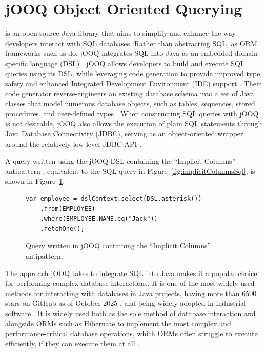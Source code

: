 \section{jOOQ Object Oriented Querying}\label{sec:jooq}

 is an open-source Java library that aims to simplify and enhance the way developers interact with SQL databases. Rather than abstracting SQL, as ORM frameworks such as  do, jOOQ integrates SQL into Java as an embedded domain-specific language (DSL) . jOOQ allows developers to build and execute SQL queries using its DSL, while leveraging code generation to provide improved type safety and enhanced Integrated Development Environment (IDE) support . Their code generator reverse-engineers an existing database schema into a set of Java classes that model numerous database objects, such as tables, sequences, stored procedures, and user-defined types . When constructing SQL queries with jOOQ is not desirable, jOOQ also allows the execution of plain SQL statements through Java Database Connectivity (JDBC), serving as an object-oriented wrapper around the relatively low-level JDBC API .

A query written using the jOOQ DSL containing the “Implicit Columns” antipattern , equivalent to the SQL query in Figure~\ref{fig:implicitColumnsSql}, is shown in Figure~\ref{fig:implicitColumnsJooq}.

\begin{figure}[h]
    \begin{lstlisting}[frame=none, basicstyle=\small]
var employee = dslContext.select(DSL.asterisk())
    .from(EMPLOYEE)
    .where(EMPLOYEE.NAME.eq("Jack"))
    .fetchOne();
    \end{lstlisting}
    \caption{Query written in jOOQ containing the “Implicit Columns” antipattern.}
    \label{fig:implicitColumnsJooq}
\end{figure}

The approach jOOQ takes to integrate SQL into Java makes it a popular choice for performing complex database interactions. It is one of the most widely used methods for interacting with databases in Java projects, having more than \num{6500} stars on GitHub as of October 2025 , and being widely adopted in industrial software . It is widely used both as the sole method of database interaction and alongside ORMs such as Hibernate to implement the most complex and performance-critical database operations, which ORMs often struggle to execute efficiently, if they can execute them at all .

